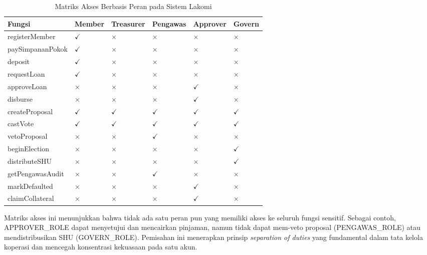 \begin{table}[H]
\centering
\caption{Matriks Akses Berbasis Peran pada Sistem Lakomi}
\label{tab:role-matrix}
\footnotesize
\begin{tabular}{p{}p{}p{}p{}p{}p{}}
\toprule
\textbf{Fungsi} & \textbf{Member} & \textbf{Treasurer} & \textbf{Pengawas} & \textbf{Approver} & \textbf{Govern} \\
\midrule
registerMember & $\checkmark$ & $\times$ & $\times$ & $\times$ & $\times$ \\
\midrule
paySimpananPokok & $\checkmark$ & $\times$ & $\times$ & $\times$ & $\times$ \\
\midrule
deposit & $\checkmark$ & $\times$ & $\times$ & $\times$ & $\times$ \\
\midrule
requestLoan & $\checkmark$ & $\times$ & $\times$ & $\times$ & $\times$ \\
\midrule
approveLoan & $\times$ & $\times$ & $\times$ & $\checkmark$ & $\times$ \\
\midrule
disburse & $\times$ & $\times$ & $\times$ & $\checkmark$ & $\times$ \\
\midrule
createProposal & $\checkmark$ & $\checkmark$ & $\checkmark$ & $\checkmark$ & $\checkmark$ \\
\midrule
castVote & $\checkmark$ & $\checkmark$ & $\checkmark$ & $\checkmark$ & $\checkmark$ \\
\midrule
vetoProposal & $\times$ & $\times$ & $\checkmark$ & $\times$ & $\times$ \\
\midrule
beginElection & $\times$ & $\times$ & $\times$ & $\times$ & $\checkmark$ \\
\midrule
distributeSHU & $\times$ & $\times$ & $\times$ & $\times$ & $\checkmark$ \\
\midrule
getPengawasAudit & $\times$ & $\times$ & $\checkmark$ & $\times$ & $\times$ \\
\midrule
markDefaulted & $\times$ & $\times$ & $\times$ & $\checkmark$ & $\times$ \\
\midrule
claimCollateral & $\times$ & $\times$ & $\times$ & $\checkmark$ & $\times$ \\
\bottomrule
\end{tabular}
\end{table}

Matriks akses ini menunjukkan bahwa tidak ada satu peran pun yang memiliki akses ke seluruh fungsi sensitif. Sebagai contoh, APPROVER\_ROLE dapat menyetujui dan mencairkan pinjaman, namun tidak dapat mem-veto proposal (PENGAWAS\_ROLE) atau mendistribusikan SHU (GOVERN\_ROLE). Pemisahan ini menerapkan prinsip \textit{separation of duties} yang fundamental dalam tata kelola koperasi dan mencegah konsentrasi kekuasaan pada satu akun.


